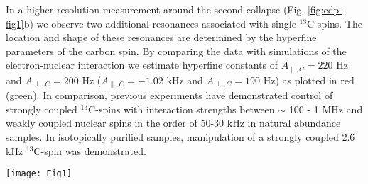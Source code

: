 In a higher resolution measurement around the second collapse (Fig. \ref{fig:cdp-fig1}b) we observe two additional resonances associated with single $^{13}$C-spins. The location and shape of these resonances are determined by the hyperfine parameters of the carbon spin\cite{Taminiau_Phys.Rev.Lett._2012}. By comparing the data with simulations of the electron-nuclear interaction we estimate hyperfine constants of $A_{\parallel,C} = 220$ Hz and $A_{\perp,C} = 200$ Hz ($A_{\parallel,C} = -1.02$ kHz and $A_{\perp,C} = 190$ Hz) as plotted in red (green). In comparison, previous experiments have demonstrated control of strongly coupled $^{13}$C-spins with interaction strengths between $\sim$ 100 - 1 MHz \cite{Jelezko_Phys.Rev.Lett._2004,Dutt_Science_2007,Pfaff_NatPhys_2013,Neumann_Science_2008} and weakly coupled nuclear spins in the order of 50-30 kHz \cite{Taminiau_NatNano_2014} in natural abundance samples. In isotopically purified samples, manipulation of a strongly coupled 2.6 kHz $^{13}$C-spin was demonstrated\cite{Maurer_Science_2012}.

 \begin{figure*}
	\centering
	\texttt{[image: Fig1]}
	\caption{\label{fig:cdp-fig1} \textbf{Detection and control of individual $^{13}$C spins.} (a) Dynamical Decoupling spectroscopy of the $^{13}$C-spin bath. Grey lines are the expected collapses of the signal due to interaction with the $^{13}$C-spin bath. They occur at $\tau_k = \frac{\pi(2k-1)}{2\omega_L}$, with $k = 1,2,3...$ the order of the resonance and $\omega_L$ the larmor frequency of the $^{13}$C spins.(b) Two $^{13}$C-spins can be identified, red (green) line is a simulation of the resulting signal for the interaction with a single spin with hyperfine constants of $A_{\parallel,C} = 220$ Hz and $A_{\perp,C} = 200$ Hz ($A_{\parallel,C} = -1.02$ kHz and $A_{\perp,C} = 190$ Hz), plotted in red: carbon 1 (green: carbon 2). (c) Free induction decay of carbon 1 with and without repetitive reset. }
\end{figure*}

